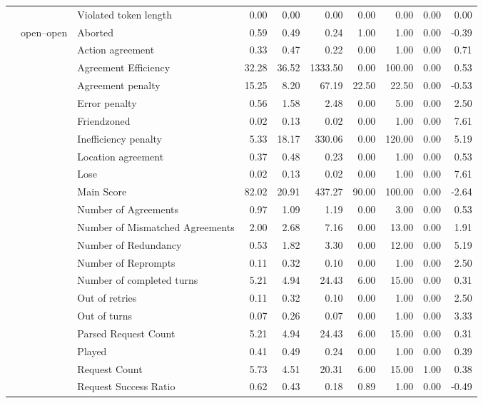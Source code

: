 \begin{tabular}{lllrrrrrrr}
 &  & Violated token length & 0.00 & 0.00 & 0.00 & 0.00 & 0.00 & 0.00 & 0.00 \\
\cline{2-10}
 & \multirow[t]{27}{*}{open--open} & Aborted & 0.59 & 0.49 & 0.24 & 1.00 & 1.00 & 0.00 & -0.39 \\
 &  & Action agreement & 0.33 & 0.47 & 0.22 & 0.00 & 1.00 & 0.00 & 0.71 \\
 &  & Agreement Efficiency & 32.28 & 36.52 & 1333.50 & 0.00 & 100.00 & 0.00 & 0.53 \\
 &  & Agreement penalty & 15.25 & 8.20 & 67.19 & 22.50 & 22.50 & 0.00 & -0.53 \\
 &  & Error penalty & 0.56 & 1.58 & 2.48 & 0.00 & 5.00 & 0.00 & 2.50 \\
 &  & Friendzoned & 0.02 & 0.13 & 0.02 & 0.00 & 1.00 & 0.00 & 7.61 \\
 &  & Inefficiency penalty & 5.33 & 18.17 & 330.06 & 0.00 & 120.00 & 0.00 & 5.19 \\
 &  & Location agreement & 0.37 & 0.48 & 0.23 & 0.00 & 1.00 & 0.00 & 0.53 \\
 &  & Lose & 0.02 & 0.13 & 0.02 & 0.00 & 1.00 & 0.00 & 7.61 \\
 &  & Main Score & 82.02 & 20.91 & 437.27 & 90.00 & 100.00 & 0.00 & -2.64 \\
 &  & Number of Agreements & 0.97 & 1.09 & 1.19 & 0.00 & 3.00 & 0.00 & 0.53 \\
 &  & Number of Mismatched Agreements & 2.00 & 2.68 & 7.16 & 0.00 & 13.00 & 0.00 & 1.91 \\
 &  & Number of Redundancy & 0.53 & 1.82 & 3.30 & 0.00 & 12.00 & 0.00 & 5.19 \\
 &  & Number of Reprompts & 0.11 & 0.32 & 0.10 & 0.00 & 1.00 & 0.00 & 2.50 \\
 &  & Number of completed turns & 5.21 & 4.94 & 24.43 & 6.00 & 15.00 & 0.00 & 0.31 \\
 &  & Out of retries & 0.11 & 0.32 & 0.10 & 0.00 & 1.00 & 0.00 & 2.50 \\
 &  & Out of turns & 0.07 & 0.26 & 0.07 & 0.00 & 1.00 & 0.00 & 3.33 \\
 &  & Parsed Request Count & 5.21 & 4.94 & 24.43 & 6.00 & 15.00 & 0.00 & 0.31 \\
 &  & Played & 0.41 & 0.49 & 0.24 & 0.00 & 1.00 & 0.00 & 0.39 \\
 &  & Request Count & 5.73 & 4.51 & 20.31 & 6.00 & 15.00 & 1.00 & 0.38 \\
 &  & Request Success Ratio & 0.62 & 0.43 & 0.18 & 0.89 & 1.00 & 0.00 & -0.49 \\

\end{tabular}
